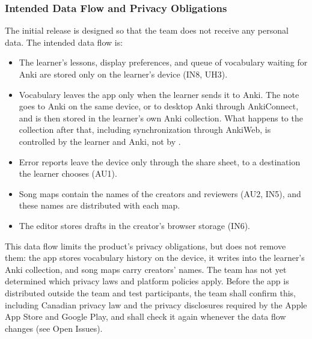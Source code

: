 \documentclass[12pt]{article}
\begin{document}
\subsubsection*{Intended Data Flow and Privacy Obligations}
The initial release is designed so that the team does not receive any
personal data. The intended data flow is:
\begin{itemize}
    \item The learner's lessons, display preferences, and queue of vocabulary
          waiting for Anki are stored only on the learner's device (IN8, UH3).
    \item Vocabulary leaves the app only when the learner sends it to Anki.
          The note goes to Anki on the same device, or to desktop Anki through
          AnkiConnect, and is then stored in the learner's own Anki collection.
          What happens to the collection after that, including synchronization
          through AnkiWeb, is controlled by the learner and Anki, not by
          \progname{}.
    \item Error reports leave the device only through the share sheet, to a
          destination the learner chooses (AU1).
    \item Song maps contain the names of the creators and reviewers (AU2, IN5),
          and these names are distributed with each map.
    \item The editor stores drafts in the creator's browser storage (IN6).
\end{itemize}

This data flow limits the product's privacy obligations, but does not remove
them: the app stores vocabulary history on the device, it writes into the
learner's Anki collection, and song maps carry creators' names. The team has
not yet determined which privacy laws and platform policies apply. Before the
app is distributed outside the team and test participants, the team shall
confirm this, including Canadian privacy law and the privacy disclosures
required by the Apple App Store and Google Play, and shall check it again
whenever the data flow changes (see Open Issues).
\end{document}
